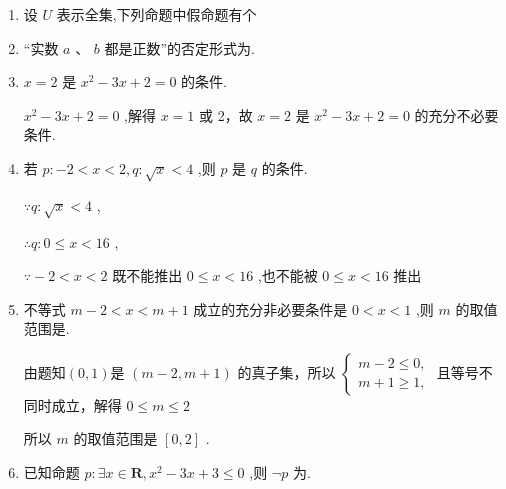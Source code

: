 \begin{enumerate}
    \item 设 $U$ 表示全集,下列命题中假命题有个
    \item “实数 $a$ 、 $b$ 都是正数”的否定形式为.
    
    \item $x = 2$ 是 ${x}^{2} - {3x} + 2 = 0$ 的条件.
    \begin{jieda}
        ${x}^{2} - {3x} + 2 = 0$ ,解得 $x = 1$ 或 2，故 $x = 2$ 是 ${x}^{2} - {3x} + 2 = 0$ 的充分不必要条件.
    \end{jieda}
    
    \item 若 $p :  - 2 < x < 2,q : \sqrt{x} < 4$ ,则 $p$ 是 $q$ 的条件.
    \begin{jieda}
        $\because q : \sqrt{x} < 4$ ,
        
        $\therefore q : 0 \leq  x < {16}$ ,
        
        $\because  - 2 < x < 2$ 既不能推出 $0 \leq  x < {16}$ ,也不能被 $0 \leq  x < {16}$ 推出
    \end{jieda}
    \item 不等式 $m - 2 < x < m + 1$ 成立的充分非必要条件是 $0 < x < 1$ ,则 $m$ 的取值范围是.
    \begin{jieda}
        由题知$(0,1)$是 $\left( {m - 2,m + 1}\right)$ 的真子集，所以 $\left\{  \begin{array}{l} m - 2 \leq  0, \\  m + 1 \geq  1, \end{array}\right.$ 且等号不同时成立，解得 $0 \leq  m \leq  2$ 
        
        所以 $m$ 的取值范围是 $\left\lbrack  {0,2}\right\rbrack$ .
    \end{jieda}
    \item 已知命题 $p : \exists x \in  \mathbf{R},{x}^{2} - {3x} + 3 \leq  0$ ,则 $\neg p$ 为.
\end{enumerate}
\clearpage

